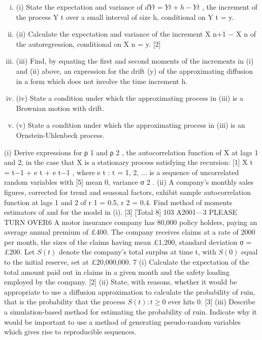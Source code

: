 \documentclass[a4paper,12pt]{article}
\begin{document}
\begin{enumerate}
\begin{enumerate}[(i)]
\item (i) State the expectation and variance of $dY t = Y t+h − Y t$ , the increment of the process Y t over a small interval of size h, conditional on Y t = y.

\item (ii) Calculate the expectation and variance of the increment X n+1 − X n of the autoregression, conditional on X n = y.
[2]
\item (iii) Find, by equating the first and second moments of the increments in (i) and (ii) above, an expression for the drift \mu(y) of the approximating diffusion in a form which does not involve the time increment h.
\item 
(iv) State a condition under which the approximating process in (iii) is a Brownian motion with drift.
\item 
(v) State a condition under which the approximating process in (iii) is an Ornstein-Uhlenbeck process.
\end{enumerate}
(i) Derive expressions for ρ 1 and ρ 2 , the autocorrelation function of X at lags
1 and 2, in the case that X is a stationary process satisfying the recursion:
[1]
X t = \alphaX t−1 + e t + \beta e t−1 ,
where {e t : t = 1, 2, ...} is a sequence of uncorrelated random variables with
[5]
mean 0, variance σ 2 .
(ii)
A company’s monthly sales figures, corrected for trend and seasonal factors, exhibit sample autocorrelation function at lags 1 and 2 of r 1 = 0.5,
r 2 = 0.4. Find method of moments estimators of \alpha and \beta for the model
in (i).
[3]
[Total 8]
103 A2001—3
PLEASE TURN OVER6
A motor insurance company has 80,000 policy holders, paying an average annual
premium of £400. The company receives claims at a rate of 2000 per month, the sizes of the claims having mean £1,200, standard deviation σ = £200.
Let $S(t)$ denote the company’s total surplus at time t, with $S(0)$ equal to the initial reserve, set at £20,000,000.
7
(i) Calculate the expectation of the total amount paid out in claims in a given month and the safety loading employed by the company.
[2]
(ii) State, with reasons, whether it would be appropriate to use a diffusion approximation to calculate the probability of ruin, that is the probability
that the process ${S(t) : t \geq 0}$ ever hits 0.
[3]
(iii) Describe a simulation-based method for estimating the probability of ruin.
Indicate why it would be important to use a method of generating pseudo-random variables which gives rise to reproducible sequences.

\end{enumerate}
\end{document}
